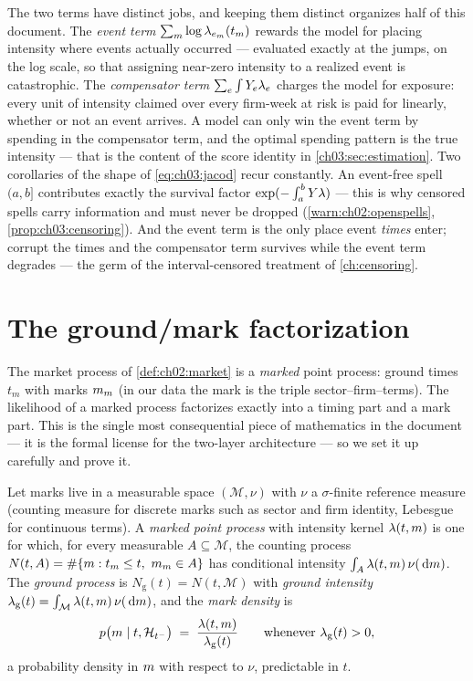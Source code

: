 The two terms have distinct jobs, and keeping them distinct organizes half
of this document. The \emph{event term} $\sum_m \log\lambda_{e_m}(t_m)$
rewards the model for placing intensity where events actually occurred ---
evaluated exactly at the jumps, on the log scale, so that assigning
near-zero intensity to a realized event is catastrophic. The
\emph{compensator term} $\sum_e\int Y_e\lambda_e$ charges the model for
exposure: every unit of intensity claimed over every firm-week at risk is
paid for linearly, whether or not an event arrives. A model can only win
the event term by spending in the compensator term, and the optimal
spending pattern is the true intensity --- that is the content of the score
identity in \cref{ch03:sec:estimation}. Two corollaries of the shape of
\cref{eq:ch03:jacod} recur constantly. An event-free spell $(a,b]$
contributes exactly the survival factor $\exp(-\int_a^b Y\lambda)$ ---
this is why censored spells carry information and must never be dropped
(\cref{warn:ch02:openspells}, \cref{prop:ch03:censoring}). And the event
term is the only place event \emph{times} enter; corrupt the times and the
compensator term survives while the event term degrades --- the germ of
the interval-censored treatment of \cref{ch:censoring}.

\section{The ground/mark factorization}\label{ch03:sec:groundmark}

The market process of \cref{def:ch02:market} is a \emph{marked} point
process: ground times $t_m$ with marks $m_m$ (in our data the mark is
the triple sector--firm--terms). The likelihood of a marked process
factorizes exactly into a timing part and a mark part. This is the single
most consequential piece of mathematics in the document --- it is the
formal license for the two-layer architecture --- so we set it up
carefully and prove it.

\begin{definition}\label{def:ch03:markedintensity}
Let marks live in a measurable space $(\mathcal M, \nu)$ with $\nu$ a
$\sigma$-finite reference measure (counting measure for discrete marks such
as sector and firm identity, Lebesgue for continuous terms). A
\emph{marked point process} with intensity kernel $\lambda(t,m)$ is one
for which, for every measurable $A \subseteq \mathcal M$, the counting
process $N(t,A) = \#\{m : t_m \le t,\ m_m \in A\}$ has conditional
intensity $\int_A \lambda(t,m)\,\nu(\,\mathrm{d}m)$. The \emph{ground
process} is $N_{\mathrm g}(t) = N(t,\mathcal M)$ with \emph{ground
intensity} $\lambda_{\mathrm g}(t) = \int_{\mathcal M}
\lambda(t,m)\,\nu(\,\mathrm{d}m)$, and the \emph{mark density} is
\begin{equation}\label{eq:ch03:markdensity}
p\big(m \mid t, \mathcal{H}_{t^-}\big)
 \;=\; \frac{\lambda(t,m)}{\lambda_{\mathrm g}(t)}
 \qquad \text{whenever } \lambda_{\mathrm g}(t) > 0,
\end{equation}
a probability density in $m$ with respect to $\nu$, predictable in
$t$.
\end{definition}

